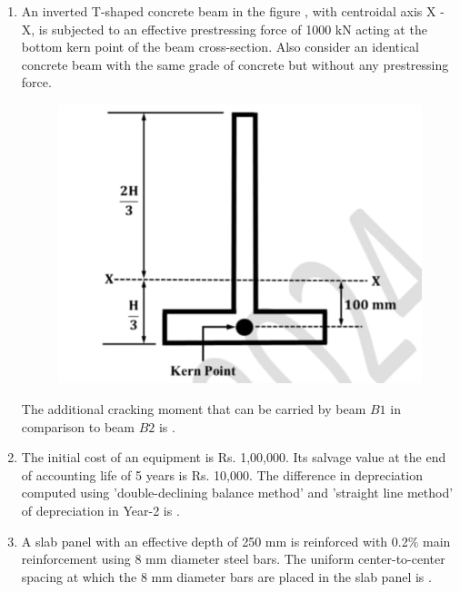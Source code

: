 \documentclass[journal,12pt,onecolumn]{article}
\theoremstyle{remark}
\begin{document}
\begin{enumerate}
    \item An inverted T-shaped concrete beam  in the figure , with centroidal axis X - X, is subjected to an effective prestressing force of 1000 kN acting at the bottom kern point of the beam cross-section. Also consider an identical concrete beam  with the same grade of concrete but without any prestressing force.
    \begin{figure}[H]
        \centering
        \includegraphics[width=0.7\columnwidth]{figs/1Q50.jpg}
        \caption{}
        \label{fig:q50}
    \end{figure}
    The additional cracking moment  that can be carried by beam $B1$ in comparison to beam $B2$ is \underline{\hspace{2cm}} .
    
    \hfill{}
    
    \item The initial cost of an equipment is Rs. 1,00,000. Its salvage value at the end of accounting life of 5 years is Rs. 10,000. The difference in depreciation  computed using 'double-declining balance method' and 'straight line method' of depreciation in Year-2 is \underline{\hspace{2cm}} .
    
    \hfill{}
    
    \item A slab panel with an effective depth of 250 mm is reinforced with 0.2\% main reinforcement using 8 mm diameter steel bars. The uniform center-to-center spacing  at which the 8 mm diameter bars are placed in the slab panel is \underline{\hspace{2cm}} .
    

\end{enumerate}
\end{document}
